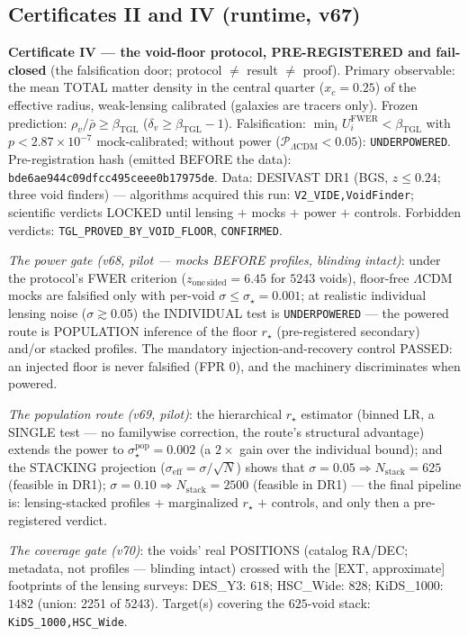 \documentclass[11pt]{article}
\newcommand{\bTGL}{\beta_{\mathrm{TGL}}}\newcommand{\Msun}{M_{\odot}}\newcommand{\TGL}{\mathrm{TGL}}
\theoremstyle{definition}\newtheorem{deriv}{Derivation}
\begin{document}
\subsection*{Certificates II and IV (runtime, v67)}

\textbf{Certificate IV --- the void-floor protocol, PRE-REGISTERED and fail-closed} (the falsification door; protocol $\neq$ result $\neq$ proof). Primary observable: the mean TOTAL matter density in the central quarter ($x_c=0.25$) of the effective radius, weak-lensing calibrated (galaxies are tracers only). Frozen prediction: $\rho_v/\bar\rho\ge\bTGL$ ($\delta_v\ge\bTGL-1$). Falsification: $\min_i U_i^{\mathrm{FWER}}<\bTGL$ with $p<2.87\times10^{-7}$ mock-calibrated; without power ($\mathcal P_{\Lambda\mathrm{CDM}}<0.05$): \texttt{UNDERPOWERED}. Pre-registration hash (emitted BEFORE the data): \texttt{bde6ae944c09dfcc495ceee0b17975de}. Data: DESIVAST DR1 (BGS, $z\le0.24$; three void finders) --- algorithms acquired this run: \texttt{V2\_VIDE,VoidFinder}; scientific verdicts LOCKED until lensing $+$ mocks $+$ power $+$ controls. Forbidden verdicts: \texttt{TGL\_PROVED\_BY\_VOID\_FLOOR}, \texttt{CONFIRMED}.

\emph{The power gate (v68, pilot --- mocks BEFORE profiles, blinding intact)}: under the protocol's FWER criterion ($z_{\mathrm{one\,sided}}=6.45$ for $5243$ voids), floor-free $\Lambda$CDM mocks are falsified only with per-void $\sigma\le\sigma_\star=0.001$; at realistic individual lensing noise ($\sigma\gtrsim0.05$) the INDIVIDUAL test is \texttt{UNDERPOWERED} --- the powered route is POPULATION inference of the floor $r_\star$ (pre-registered secondary) and/or stacked profiles. The mandatory injection-and-recovery control PASSED: an injected floor is never falsified (FPR $0$), and the machinery discriminates when powered.

\emph{The population route (v69, pilot)}: the hierarchical $r_\star$ estimator (binned LR, a SINGLE test --- no familywise correction, the route's structural advantage) extends the power to $\sigma^{\mathrm{pop}}_\star=0.002$ (a $2\times$ gain over the individual bound); and the STACKING projection ($\sigma_{\mathrm{eff}}=\sigma/\sqrt{N}$) shows that $\sigma=0.05\Rightarrow N_{\mathrm{stack}}=625$ (feasible in DR1); $\sigma=0.10\Rightarrow N_{\mathrm{stack}}=2500$ (feasible in DR1) --- the final pipeline is: lensing-stacked profiles $+$ marginalized $r_\star$ $+$ controls, and only then a pre-registered verdict.

\emph{The coverage gate (v70)}: the voids' real POSITIONS (catalog RA/DEC; metadata, not profiles --- blinding intact) crossed with the [EXT, approximate] footprints of the lensing surveys: DES\_Y3: $618$; HSC\_Wide: $828$; KiDS\_1000: $1482$ (union: 2251 of 5243). Target(s) covering the $625$-void stack: \texttt{KiDS\_1000,HSC\_Wide}.
\end{document}
